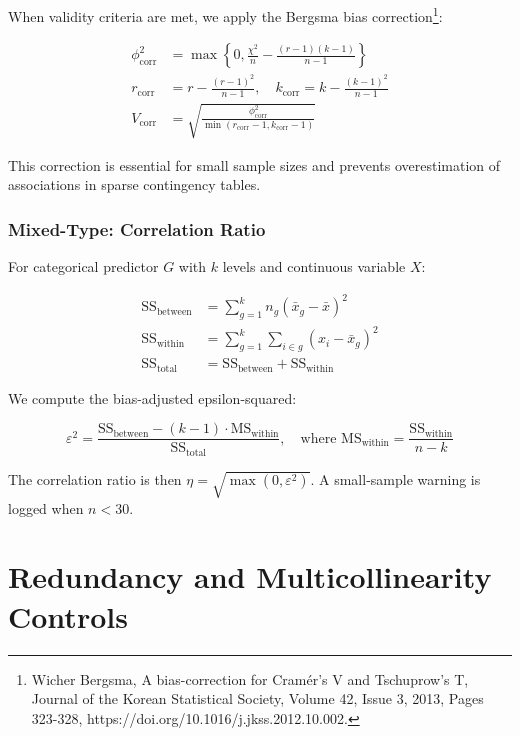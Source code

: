 When validity criteria are met, we apply the Bergsma bias correction\footnote{Wicher Bergsma, A bias-correction for Cramér’s V and Tschuprow’s T, Journal of the Korean Statistical Society,
Volume 42, Issue 3, 2013, Pages 323-328, https://doi.org/10.1016/j.jkss.2012.10.002.}:

\begin{align}
\phi^2_{\text{corr}} &= \max\left\{0, \frac{\chi^2}{n} - \frac{(r-1)(k-1)}{n-1}\right\} \\
r_{\text{corr}} &= r - \frac{(r-1)^2}{n-1}, \quad k_{\text{corr}} = k - \frac{(k-1)^2}{n-1} \\
V_{\text{corr}} &= \sqrt{\frac{\phi^2_{\text{corr}}}{\min(r_{\text{corr}}-1, k_{\text{corr}}-1)}}
\label{eq:cramers-v}
\end{align}

This correction is essential for small sample sizes and prevents overestimation of associations in sparse contingency tables.

\subsubsection{Mixed-Type: Correlation Ratio}

For categorical predictor $G$ with $k$ levels and continuous variable $X$:

\begin{align}
\text{SS}_{\text{between}} &= \sum_{g=1}^{k} n_g(\bar{x}_g - \bar{x})^2 \\
\text{SS}_{\text{within}} &= \sum_{g=1}^{k} \sum_{i \in g} (x_i - \bar{x}_g)^2 \\
\text{SS}_{\text{total}} &= \text{SS}_{\text{between}} + \text{SS}_{\text{within}}
\end{align}

We compute the bias-adjusted epsilon-squared:

\begin{equation}
\varepsilon^2 = \frac{\text{SS}_{\text{between}} - (k-1) \cdot \text{MS}_{\text{within}}}{\text{SS}_{\text{total}}}, \quad \text{where } \text{MS}_{\text{within}} = \frac{\text{SS}_{\text{within}}}{n-k}
\label{eq:epsilon-squared}
\end{equation}

The correlation ratio is then $\eta = \sqrt{\max(0, \varepsilon^2)}$. A small-sample warning is logged when $n < 30$.

\section{Redundancy and Multicollinearity Controls}

